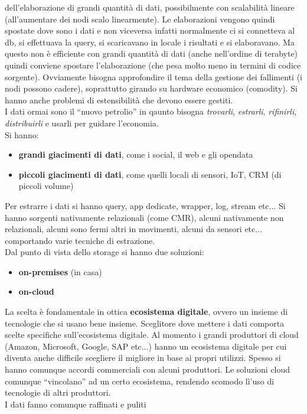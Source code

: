 \documentclass[a4paper,12pt, oneside]{book}
\begin{document}
dell'elaborazione di grandi quantità di dati, possibilmente con scalabilità
lineare (all'aumentare dei nodi scalo linearmente). Le elaborazioni vengono
quindi spostate dove sono i dati e non viceversa infatti normalmente ci si
connetteva al db, si effettuava la query, si scaricavano in locale i risultati e
si elaboravano. Ma questo non è efficiente con grandi quantità di dati (anche
nell'ordine di terabyte) quindi conviene spostare l'elaborazione (che pesa molto
meno in termini di codice sorgente). Ovviamente bisogna approfondire il tema
della gestione dei fallimenti (i nodi possono cadere), soprattutto girando su
hardware economico (comodity). Si hanno anche problemi di estensibilità che
devono essere gestiti.\\
I dati ormai sono il ``nuovo petrolio'' in qaunto bisogna \textit{trovarli},
\textit{estrarli}, \textit{rifinirli}, \textit{distribuirli} e usarli per
guidare l'economia.\\
Si hanno:
\begin{itemize}
  \item \textbf{grandi giacimenti di dati}, come i social, il web e gli opendata
  \item \textbf{piccoli giacimenti di dati}, come quelli locali di sensori, IoT,
  CRM (di piccoli volume)
\end{itemize}
Per estrarre i dati si hanno query, app dedicate, wrapper, log, stream
etc$\ldots$ Si hanno sorgenti nativamente relazionali (come CMR), alcuni
nativamente non relazionali, alcuni sono fermi altri in movimenti, alcuni da
sensori etc$\ldots$ comportando varie tecniche di estrazione.\\
Dal punto di vista dello storage si hanno due soluzioni:
\begin{itemize}
  \item \textbf{on-premises} (in casa)
  \item \textbf{on-cloud}
\end{itemize}
La scelta è fondamentale in ottica \textbf{ecosistema digitale}, ovvero un
insieme di tecnologie che si usano bene insieme. Sceglitore dove mettere i dati
comporta scelte specifiche sull'ecosistema digitale. Al momento i grandi
produttori di cloud (Amazon, Microsoft, Google, SAP etc$\ldots$) hanno un
ecosistema digitale per cui diventa anche difficile scegliere il migliore in
base ai propri utilizzi. Spesso si hanno comunque accordi commerciali con alcuni
produttori. Le soluzioni cloud comunque ``vincolano'' ad un certo ecosistema,
rendendo scomodo lì'uso di tecnologie di altri produttori.\\
I dati fanno comunque raffinati e puliti
\end{document}
